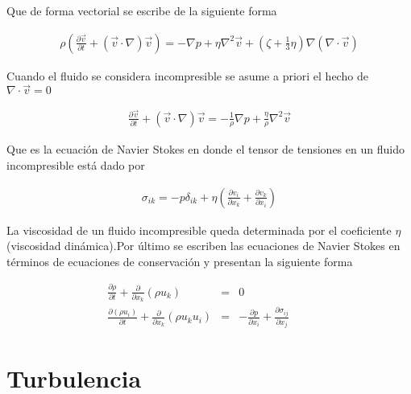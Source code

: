 \noindent Que de forma vectorial se escribe de la siguiente forma

\begin{eqnarray}
\rho \left(\frac{\partial \vec{v}}{\partial t}+(\vec{v} \cdot \nabla )\vec{v}\right) = -\nabla p +\eta \nabla^{2}\vec{v} + \left(\zeta + \frac{1}{3}\eta\right)\nabla(\nabla \cdot \vec{v}) 
\end{eqnarray}

\noindent Cuando el fluido se considera incompresible se asume a priori el hecho de $\nabla \cdot \vec{v} = 0$

\begin{eqnarray}
\label{NS}
\frac{\partial \vec{v}}{\partial t}+(\vec{v} \cdot \nabla )\vec{v} = -\frac{1}{\rho}\nabla p +\frac{\eta}{\rho} \nabla^{2}\vec{v}
\end{eqnarray}

\noindent Que es la ecuación de Navier Stokes en donde el tensor de tensiones en un fluido incompresible está dado por 

\begin{eqnarray}
\sigma_{ik} = -p\delta_{ik} + \eta\left(\frac{\partial v_{i}}{\partial x_{k}} + \frac{\partial v_{k}}{\partial x_{i}  }\right)
\end{eqnarray}

\noindent La viscosidad de un fluido incompresible queda determinada por el coeficiente $\eta$ (viscosidad dinámica).Por último se escriben las ecuaciones de Navier Stokes en términos de ecuaciones de conservación y presentan la siguiente forma 

\begin{eqnarray}
\label{continuidad}
\frac{\partial \rho}{\partial t}+\frac{\partial }{\partial x_{k}}(\rho u_{k})&=& 0 \qquad \\
\label{NS}
\frac{\partial(\rho u_{i})}{\partial t}+\frac{\partial}{\partial x_{k}}(\rho u_{k}u_{i})&=&-\frac{\partial p}{\partial x_{i}}+\frac{\partial \sigma_{ij}}{\partial x_{j}} \qquad 
\end{eqnarray}

\section{Turbulencia}

